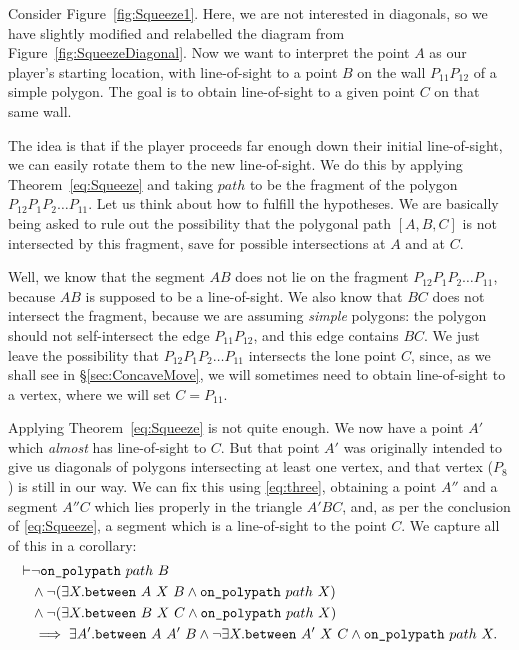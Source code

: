Consider Figure~\ref{fig:Squeeze1}. Here, we are not interested in diagonals, so we have slightly modified and relabelled the diagram from Figure~\ref{fig:SqueezeDiagonal}. Now we want to interpret the point $A$ as our player's starting location, with line-of-sight to a point $B$ on the wall $P_{11}P_{12}$ of a simple polygon. The goal is to obtain line-of-sight to a given point $C$ on that same wall.

The idea is that if the player proceeds far enough down their initial line-of-sight, we can easily rotate them to the new line-of-sight. We do this by applying Theorem~\ref{eq:Squeeze} and taking $path$ to be the fragment of the polygon $P_{12}P_1P_2\ldots P_{11}$. Let us think about how to fulfill the hypotheses. We are basically being asked to rule out the possibility that the polygonal path $[A,B,C]$ is not intersected by this fragment, save for possible intersections at $A$ and at $C$. 

Well, we know that the segment $AB$ does not lie on the fragment $P_{12}P_1P_2\ldots P_{11}$, because $AB$ is supposed to be a line-of-sight. We also know that $BC$ does not intersect the fragment, because we are assuming \emph{simple} polygons: the polygon should not self-intersect the edge $P_{11}P_{12}$, and this edge contains $BC$. We just leave the possibility that $P_{12}P_1P_2\ldots P_{11}$ intersects the lone point $C$, since, as we shall see in \S\ref{sec:ConcaveMove}, we will sometimes need to obtain line-of-sight to a vertex, where we will set $C=P_{11}$.

Applying Theorem~\ref{eq:Squeeze} is not quite enough. We now have a point $A'$ which \emph{almost} has line-of-sight to $C$. But that point $A'$ was originally intended to give us diagonals of polygons intersecting at least one vertex, and that vertex ($P_8$) is still in our way. We can fix this using \ref{eq:three}, obtaining a point $A''$ and a segment $A''C$ which lies properly in the triangle $A'BC$, and, as per the conclusion of \eqref{eq:Squeeze}, a segment which is a line-of-sight to the point $C$. We capture all of this in a corollary:
\begin{equation}\label{eq:Squeeze2}
  \begin{aligned}
\vdash    &\neg\texttt{on\_polypath}\ path\ B\\
    &\wedge \neg(\exists X. \texttt{between}\ A\ X\ B \wedge \texttt{on\_polypath}\ path\ X)\\
    &\wedge \neg(\exists X. \texttt{between}\ B\ X\ C \wedge \texttt{on\_polypath}\ path\ X)\\
    &\implies \exists A'. \texttt{between}\ A\ A'\ B \wedge \neg\exists X. \texttt{between}\ A'\ X\ C \wedge \texttt{on\_polypath}\ path\ X.
  \end{aligned}
\end{equation}

